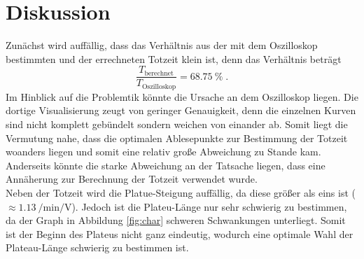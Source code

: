 \section{Diskussion}
\label{sec:Diskussion}
Zunächst wird auffällig, dass das Verhältnis aus der mit dem Oszilloskop bestimmten und der errechneten Totzeit klein ist, denn
das Verhältnis beträgt
\begin{equation*}
    \frac{T_\text{berechnet}}{T_\text{Oszilloskop}} = \SI{68.75}{\percent} \; \text{.}
\end{equation*}
Im Hinblick auf die Problemtik könnte die Ursache an dem Oszilloskop liegen. 
Die dortige Visualisierung zeugt von geringer Genauigkeit, denn die einzelnen Kurven sind nicht komplett gebündelt sondern weichen von einander ab.
Somit liegt die Vermutung nahe, dass die optimalen Ablesepunkte zur Bestimmung der Totzeit woanders liegen und somit eine relativ große Abweichung zu Stande kam.
Anderseits könnte die starke Abweichung an der Tatsache liegen, dass eine Annäherung zur Berechnung der Totzeit verwendet wurde.\\
Neben der Totzeit wird die Platue-Steigung auffällig, da diese  größer als eins ist ($\approx \SI{1.13}{\per\minute\per\volt}$).
Jedoch ist die Plateu-Länge nur sehr schwierig zu bestimmen, da der Graph in Abbildung \ref{fig:char}
schweren Schwankungen unterliegt. 
Somit ist der Beginn des Plateus nicht ganz eindeutig, wodurch eine optimale Wahl der Plateau-Länge schwierig zu bestimmen ist.